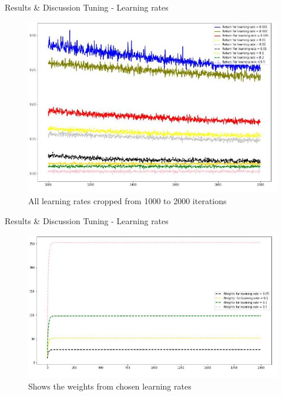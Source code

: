 \documentclass{beamer}
\begin{document}
\begin{frame}{Results \& Discussion }{Tuning - Learning rates\vphantom{(y}}
\vspace{-0.7em}
\begin{figure}
  \includegraphics[scale=0.5]{images/lr_cropped_end.JPG}
  \caption{All learning rates cropped from 1000 to 2000 iterations}
\end{figure}
\end{frame}

\begin{frame}{Results \& Discussion }{Tuning - Learning rates\vphantom{(y}}
\vspace{-0.7em}
\begin{figure}
  \includegraphics[scale=0.5]{images/weights.JPG}
  \caption{Shows the weights from chosen learning rates}
\end{figure}
\end{frame}
\end{document}
